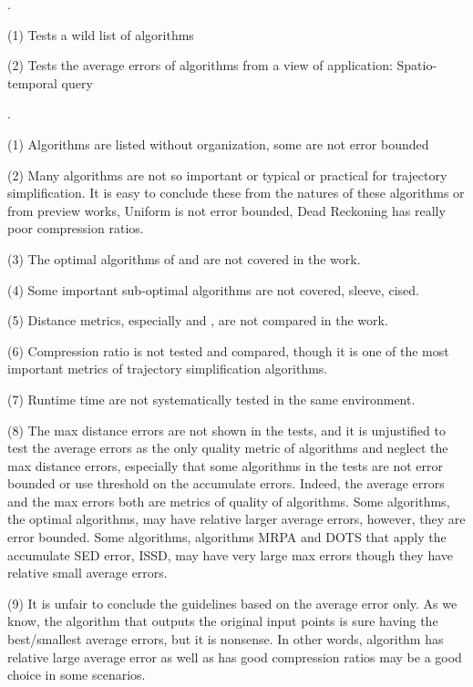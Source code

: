 .

(1) Tests a wild list of algorithms

(2) Tests the average errors of algorithms from a view of application: Spatio-temporal query

.

(1) Algorithms are listed without organization, some are not error bounded

(2) Many algorithms are not so important or typical or practical for trajectory simplification. It is easy to conclude these from the natures of these algorithms or from preview works, \eg Uniform is not error bounded, Dead Reckoning has really poor compression ratios.

(3) The optimal algorithms of \ped and \sed are not covered in the work.

(4) Some important sub-optimal algorithms are not covered, \eg sleeve, cised.

(5) Distance metrics, especially \ped and \sed, are not compared in the work.

(6) Compression ratio is not tested and compared, though it is one of the most important metrics of trajectory simplification algorithms.

(7) Runtime time are not systematically tested in the same environment.

(8) The max distance errors are not shown in the tests, and it is unjustified to test the average errors as the only quality metric of algorithms and neglect the max distance errors, especially that some algorithms in the tests are not error bounded or use threshold on the accumulate errors.
Indeed, the average errors and the max errors both are metrics of quality of algorithms. Some algorithms, \eg the optimal algorithms, may have relative larger average errors, however, they are error bounded. Some algorithms, \eg algorithms MRPA and DOTS that apply the accumulate SED error, ISSD, may have very large max errors though they have relative small average errors.

(9) It is unfair to conclude the guidelines based on the average error only. As we know, the algorithm that outputs the original input points is sure having the best/smallest average errors, but it is nonsense. In other words, algorithm has relative large average error as well as has good compression ratios may be a good choice in some scenarios.

